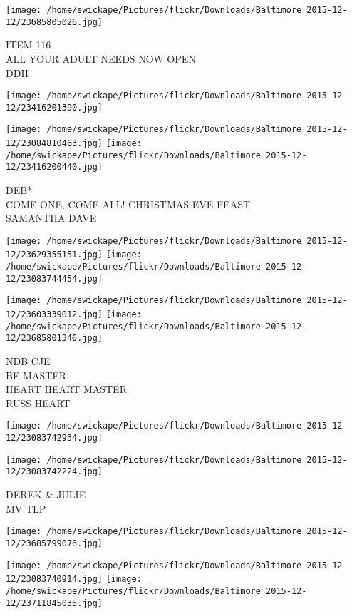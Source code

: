 \documentclass[10pt,letterpaper]{article}
\begin{document}
\texttt{[image: /home/swickape/Pictures/flickr/Downloads/Baltimore 2015-12-12/23685805026.jpg]}

ITEM 116\\
ALL YOUR ADULT NEEDS NOW OPEN\\
DDH\\
\pagebreak

\texttt{[image: /home/swickape/Pictures/flickr/Downloads/Baltimore 2015-12-12/23416201390.jpg]}

\vspace{0.25in}
\texttt{[image: /home/swickape/Pictures/flickr/Downloads/Baltimore 2015-12-12/23084810463.jpg]}
\texttt{[image: /home/swickape/Pictures/flickr/Downloads/Baltimore 2015-12-12/23416200440.jpg]}

DEB*\\
COME ONE, COME ALL!  CHRISTMAS EVE FEAST\\
SAMANTHA DAVE\\
\pagebreak

\texttt{[image: /home/swickape/Pictures/flickr/Downloads/Baltimore 2015-12-12/23629355151.jpg]}
\texttt{[image: /home/swickape/Pictures/flickr/Downloads/Baltimore 2015-12-12/23083744454.jpg]}

\texttt{[image: /home/swickape/Pictures/flickr/Downloads/Baltimore 2015-12-12/23603339012.jpg]}
\texttt{[image: /home/swickape/Pictures/flickr/Downloads/Baltimore 2015-12-12/23685801346.jpg]}

NDB CJE\\
BE MASTER\\
HEART HEART MASTER\\
RUSS HEART\\
\pagebreak

\texttt{[image: /home/swickape/Pictures/flickr/Downloads/Baltimore 2015-12-12/23083742934.jpg]}

\vspace{0.25in}
\texttt{[image: /home/swickape/Pictures/flickr/Downloads/Baltimore 2015-12-12/23083742224.jpg]}

DEREK \& JULIE\\
MV TLP\\
\pagebreak

\texttt{[image: /home/swickape/Pictures/flickr/Downloads/Baltimore 2015-12-12/23685799076.jpg]}

\vspace{0.25in}
\texttt{[image: /home/swickape/Pictures/flickr/Downloads/Baltimore 2015-12-12/23083740914.jpg]}
\texttt{[image: /home/swickape/Pictures/flickr/Downloads/Baltimore 2015-12-12/23711845035.jpg]}
\end{document}
